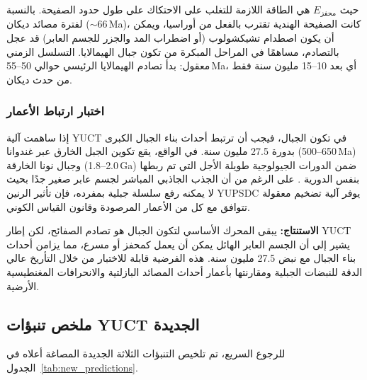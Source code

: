 \documentclass[11pt,a4paper]{article}
\begin{document}
	حيث \(E_{\text{محفز}}\) هي الطاقة اللازمة للتغلب على الاحتكاك على طول حدود الصفيحة. بالنسبة لفترة مصائد ديكان (\(\sim 66\) Ma)، كانت الصفيحة الهندية تقترب بالفعل من أوراسيا، ويمكن أن يكون اصطدام تشيكشولوب (أو اضطراب المد والجزر للجسم العابر) قد عجل بالتصادم، مساهمًا في المراحل المبكرة من تكون جبال الهيمالايا. التسلسل الزمني معقول: بدأ تصادم الهيمالايا الرئيسي حوالي 50–55 Ma، أي بعد 10–15 مليون سنة فقط من حدث ديكان.
	
	\subsubsection{اختبار ارتباط الأعمار}
	
	إذا ساهمت آلية YUCT في تكون الجبال، فيجب أن ترتبط أحداث بناء الجبال الكبرى بدورة 27.5 مليون سنة. في الواقع، يقع تكوين الجبل الخارق عبر غندوانا (650–500 Ma) وجبال نونا الخارقة (2.0–1.8 Ga) \cite{CampbellAllen2008} ضمن الدورات الجيولوجية طويلة الأجل التي تم ربطها بنفس الدورية \cite{Rampino2021}. على الرغم من أن الجذب الجاذبي المباشر لجسم عابر صغير جدًا بحيث لا يمكنه رفع سلسلة جبلية بمفرده، فإن تأثير الرنين YUPSDC يوفر آلية تضخيم معقولة تتوافق مع كل من الأعمار المرصودة وقانون القياس الكوني.
	
	\vspace{0.3cm}
	\noindent
	\textbf{الاستنتاج:} يبقى المحرك الأساسي لتكون الجبال هو تصادم الصفائح، لكن إطار YUCT يشير إلى أن الجسم العابر الهائل يمكن أن يعمل كمحفز أو مسرع، مما يزامن أحداث بناء الجبال مع نبض 27.5 مليون سنة. هذه الفرضية قابلة للاختبار من خلال التأريخ عالي الدقة للنبضات الجبلية ومقارنتها بأعمار أحداث المصائد البازلتية والانحرافات المغنطيسية الأرضية.
	
	
	\subsection{ملخص تنبؤات YUCT الجديدة}
	
	للرجوع السريع، تم تلخيص التنبؤات الثلاثة الجديدة المصاغة أعلاه في الجدول~\ref{tab:new_predictions}.
	
\end{document}
